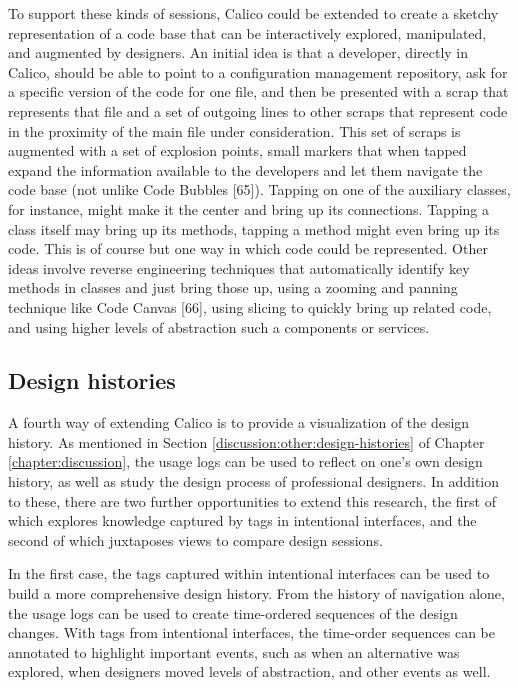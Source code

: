 To support these kinds of sessions, Calico could be extended to create a sketchy representation of a code base that can be interactively explored, manipulated, and augmented by designers. An initial idea is that a developer, directly in Calico, should be able to point to a configuration management repository, ask for a specific version of the code for one file, and then be presented with a scrap that represents that file and a set of outgoing lines to other scraps that represent code in the proximity of the main file under consideration. This set of scraps is augmented with a set of explosion points, small markers that when tapped expand the information available to the developers and let them navigate the code base (not unlike Code Bubbles [65]). Tapping on one of the auxiliary classes, for instance, might make it the center and bring up its connections. Tapping a class itself may bring up its methods, tapping a method might even bring up its code. This is of course but one way in which code could be represented. Other ideas involve reverse engineering techniques that automatically identify key methods in classes and just bring those up, using a zooming and panning technique like Code Canvas [66], using slicing to quickly bring up related code, and using higher levels of abstraction such a components or services.

\subsection{Design histories}

A fourth way of extending Calico is to provide a visualization of the design history. As mentioned in Section \ref{discussion:other:design-histories} of Chapter \ref{chapter:discussion}, the usage logs can be used to reflect on one's own design history, as well as study the design process of professional designers. In addition to these, there are two further opportunities to extend this research, the first of which explores knowledge captured by tags in intentional interfaces, and the second of which juxtaposes views to compare design sessions.

In the first case, the tags captured within intentional interfaces can be used to build a more comprehensive design history. From the history of navigation alone, the usage logs can be used to create time-ordered sequences of the design changes. With tags from intentional interfaces, the time-order sequences can be annotated to highlight important events, such as when an alternative was explored, when designers moved levels of abstraction, and other events as well. 

